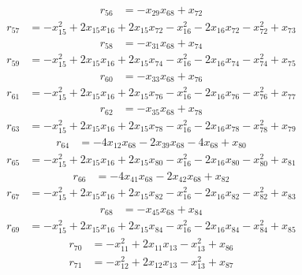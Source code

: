 \begin{align*}
r_{56}&=
-x_{29}x_{68}+x_{72}
\end{align*}
\begin{align*}
r_{57}&=
-x_{15}^{2}+2x_{15}x_{16}+2x_{15}x_{72}-x_{16}^{2}-2x_{16}x_{72}-x_{72}^{2}+x_{73}
\end{align*}
\begin{align*}
r_{58}&=
-x_{31}x_{68}+x_{74}
\end{align*}
\begin{align*}
r_{59}&=
-x_{15}^{2}+2x_{15}x_{16}+2x_{15}x_{74}-x_{16}^{2}-2x_{16}x_{74}-x_{74}^{2}+x_{75}
\end{align*}
\begin{align*}
r_{60}&=
-x_{33}x_{68}+x_{76}
\end{align*}
\begin{align*}
r_{61}&=
-x_{15}^{2}+2x_{15}x_{16}+2x_{15}x_{76}-x_{16}^{2}-2x_{16}x_{76}-x_{76}^{2}+x_{77}
\end{align*}
\begin{align*}
r_{62}&=
-x_{35}x_{68}+x_{78}
\end{align*}
\begin{align*}
r_{63}&=
-x_{15}^{2}+2x_{15}x_{16}+2x_{15}x_{78}-x_{16}^{2}-2x_{16}x_{78}-x_{78}^{2}+x_{79}
\end{align*}
\begin{align*}
r_{64}&=
-4x_{12}x_{68}-2x_{39}x_{68}-4x_{68}+x_{80}
\end{align*}
\begin{align*}
r_{65}&=
-x_{15}^{2}+2x_{15}x_{16}+2x_{15}x_{80}-x_{16}^{2}-2x_{16}x_{80}-x_{80}^{2}+x_{81}
\end{align*}
\begin{align*}
r_{66}&=
-4x_{41}x_{68}-2x_{42}x_{68}+x_{82}
\end{align*}
\begin{align*}
r_{67}&=
-x_{15}^{2}+2x_{15}x_{16}+2x_{15}x_{82}-x_{16}^{2}-2x_{16}x_{82}-x_{82}^{2}+x_{83}
\end{align*}
\begin{align*}
r_{68}&=
-x_{45}x_{68}+x_{84}
\end{align*}
\begin{align*}
r_{69}&=
-x_{15}^{2}+2x_{15}x_{16}+2x_{15}x_{84}-x_{16}^{2}-2x_{16}x_{84}-x_{84}^{2}+x_{85}
\end{align*}
\begin{align*}
r_{70}&=
-x_{11}^{2}+2x_{11}x_{13}-x_{13}^{2}+x_{86}
\end{align*}
\begin{align*}
r_{71}&=
-x_{12}^{2}+2x_{12}x_{13}-x_{13}^{2}+x_{87}
\end{align*}
